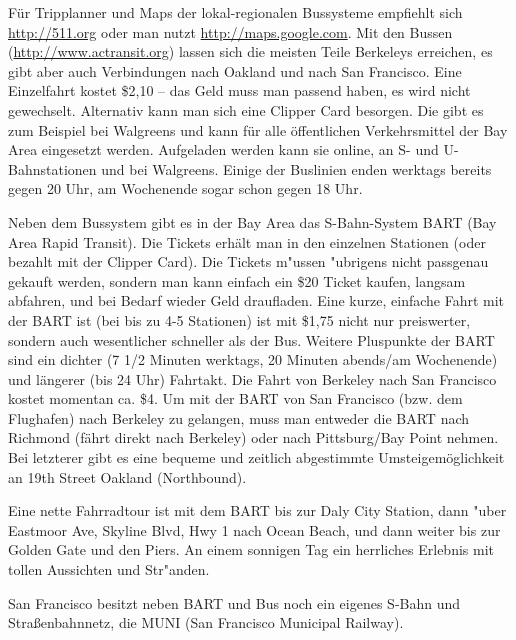 \documentclass[a4paper]{scrreprt}
\begin{document}
Für Tripplanner und Maps der lokal-regionalen Bussysteme empfiehlt sich \url{http://511.org} oder man nutzt \url{http://maps.google.com}. 
Mit den Bussen (\url{http://www.actransit.org}) lassen sich die meisten Teile Berkeleys erreichen, es gibt aber auch Verbindungen nach Oakland und nach San Francisco. 
Eine Einzelfahrt kostet \$2,10 -- das Geld muss man passend haben, es wird nicht gewechselt. 
%
%
Alternativ kann man sich eine Clipper Card besorgen. Die gibt es zum
Beispiel bei Walgreens und kann für alle öffentlichen Verkehrsmittel
der Bay Area eingesetzt werden.  Aufgeladen werden kann sie online, an S- und
U-Bahnstationen und bei Walgreens.  Einige der Buslinien enden
werktags bereits gegen 20 Uhr, am Wochenende sogar schon gegen 18 Uhr.

Neben dem Bussystem gibt es in der Bay Area das S-Bahn-System BART (Bay Area Rapid Transit).
Die Tickets erhält man in den einzelnen Stationen (oder bezahlt mit der Clipper Card).
Die Tickets m"ussen "ubrigens nicht passgenau gekauft werden, sondern man kann einfach ein \$20 Ticket kaufen, langsam abfahren, und bei Bedarf wieder Geld draufladen.
Eine kurze, einfache Fahrt mit der BART ist (bei bis zu 4-5 Stationen) ist mit \$1,75 nicht nur preiswerter, sondern auch wesentlicher schneller als der Bus. Weitere Pluspunkte der BART sind ein dichter (7 1/2 Minuten werktags, 20 Minuten abends/am Wochenende) und längerer (bis 24 Uhr) Fahrtakt.
Die Fahrt von Berkeley nach San Francisco kostet momentan ca. \$4. 
Um mit der BART von San Francisco (bzw. dem Flughafen) nach Berkeley zu gelangen, muss man entweder die BART nach Richmond (fährt direkt nach Berkeley) oder nach Pittsburg/Bay Point nehmen. 
Bei letzterer gibt es eine bequeme und zeitlich abgestimmte Umsteigemöglichkeit an 19th Street Oakland (Northbound).


Eine nette Fahrradtour ist mit dem BART bis zur Daly City Station, 
%
%
dann "uber Eastmoor Ave, Skyline Blvd, Hwy 1 nach Ocean Beach, und dann weiter bis zur Golden Gate und den Piers. 
An einem sonnigen Tag ein herrliches Erlebnis mit tollen Aussichten und Str"anden.


San Francisco besitzt neben BART und Bus noch ein eigenes S-Bahn und Straßenbahnnetz, die MUNI (San Francisco Municipal Railway). 
\end{document}
